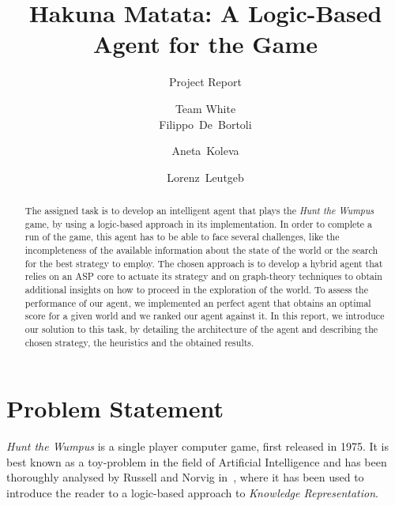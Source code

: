 \documentclass{llncs}
\title{Hakuna Matata: A Logic-Based Agent for the \htw Game}
\subtitle{Project Report}
\author{Team White\\[2mm]Filippo~De~Bortoli \and Aneta~Koleva \and Lorenz~Leutgeb}
\institute{Free University of Bozen-Bolzano\\[3mm] \texttt{\{\href{mailto:filippo.debortoli@stud-inf.unibz.it}{filippo.debortoli},\href{mailto:aneta.koleva@stud-inf.unibz.it}{aneta.koleva},\href{mailto:lorenz.leutgeb@stud-inf.unibz.it}{lorenz.leutgeb}\}\newline @stud-inf.unibz.it}}
\newcommand{\htw}{\emph{Hunt the Wumpus}\xspace}
\begin{document}
\maketitle
\thispagestyle{plain}

\begin{abstract}
  The assigned task is to develop an intelligent agent that plays the \htw game, by using a logic-based approach in its implementation.
  In order to complete a run of the game, this agent has to be able to face several challenges, like the incompleteness of the available information about the state of the world or the search for the best strategy to employ.
  The chosen approach is to develop a hybrid agent that relies on an ASP core to actuate its strategy and on graph-theory techniques to obtain additional insights on how to proceed in the exploration of the world.
  To assess the performance of our agent, we implemented an perfect agent that obtains an optimal score for a given world and we ranked our agent against it.
  In this report, we introduce our solution to this task, by detailing the architecture of the agent and describing the chosen strategy, the heuristics and the obtained results.
\end{abstract}

\section{Problem Statement}

\htw is a single player computer game, first released in 1975.
It is best known as a toy-problem in the field of Artificial Intelligence and has been thoroughly analysed by Russell and Norvig in~\cite{book:aima}, where it has been used to introduce the reader to a logic-based approach to \emph{Knowledge Representation}.
\end{document}
